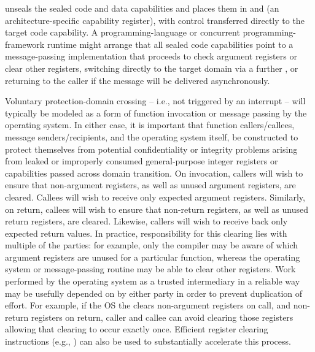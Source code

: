  unseals the sealed code and data capabilities
and places them in \PCC{} and \IDC{} (an architecture-specific
capability register), with control transferred
directly to the target code capability.
A programming-language or concurrent programming-framework runtime might
arrange that all sealed code capabilities point to a message-passing
implementation that proceeds to check argument registers or clear other
registers, switching directly to the target domain via a further
, or returning to the caller if the message will be delivered
asynchronously.

Voluntary protection-domain crossing -- i.e., not triggered by an interrupt --
will typically be modeled as a form of function invocation or message passing
by the operating system.
In either case, it is important that function callers/callees, message
senders/recipients, and the operating system itself, be constructed to protect
themselves from potential confidentiality or integrity problems arising from
leaked or improperly consumed general-purpose integer registers or
capabilities passed across domain transition.
On invocation, callers will wish to ensure that non-argument registers, as
well as unused argument registers, are cleared.
Callees will wish to receive only expected argument registers.
Similarly, on return, callees will wish to ensure that non-return registers,
as well as unused return registers, are cleared.
Likewise, callers will wish to receive back only expected return values.
In practice, responsibility for this clearing lies with multiple of the
parties: for example, only the compiler may be aware of which argument
registers are unused for a particular function, whereas the operating system
or message-passing routine may be able to clear other registers.
Work performed by the operating system as a trusted intermediary in a
reliable way may be usefully depended on by either party in order to prevent
duplication of effort.
For example, if the OS the clears non-argument
registers on call, and non-return registers on return, caller and
callee can avoid clearing those registers allowing that clearing
to occur exactly once.
Efficient register clearing instructions (e.g., ) can
also be used to substantially accelerate this process.

